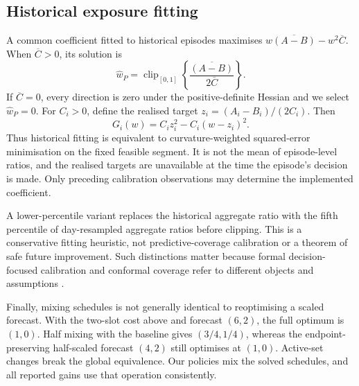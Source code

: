 \subsection{Historical exposure fitting}
A common coefficient fitted to historical episodes maximises
$w\overline{(A-B)}-w^2\overline C$. When $\overline C>0$, its solution is
\begin{equation}
 \widehat w_P=\operatorname{clip}_{[0,1]}
 \left\{\frac{\overline{(A-B)}}{2\overline C}\right\}.
 \label{eq:plugin}
\end{equation}
If $\overline C=0$, every direction is zero under the positive-definite Hessian and we select $\widehat w_P=0$. For $C_i>0$, define the realised target $z_i=(A_i-B_i)/(2C_i)$. Then
\[
 G_i(w)=C_i z_i^2-C_i(w-z_i)^2.
\]
Thus historical fitting is equivalent to curvature-weighted squared-error minimisation on the fixed feasible segment. It is not the mean of episode-level ratios, and the realised targets are unavailable at the time the episode's decision is made. Only preceding calibration observations may determine the implemented coefficient.

A lower-percentile variant replaces the historical aggregate ratio with the fifth percentile of day-resampled aggregate ratios before clipping. This is a conservative fitting heuristic, not predictive-coverage calibration or a theorem of safe future improvement. Such distinctions matter because formal decision-focused calibration and conformal coverage refer to different objects and assumptions \citep{liu2021,barber2023}.

Finally, mixing schedules is not generally identical to reoptimising a scaled forecast. With the two-slot cost above and forecast $(6,2)$, the full optimum is $(1,0)$. Half mixing with the baseline gives $(3/4,1/4)$, whereas the endpoint-preserving half-scaled forecast $(4,2)$ still optimises at $(1,0)$. Active-set changes break the global equivalence. Our policies mix the solved schedules, and all reported gains use that operation consistently.
